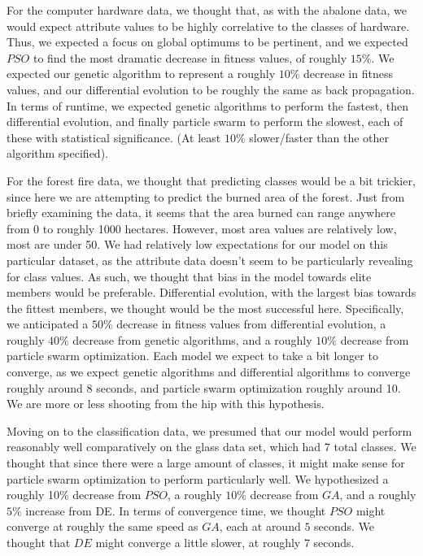 \documentclass[twoside,11pt]{article}
\begin{document}
  For the computer hardware data, we thought that, as with the abalone data, we would expect attribute values to be highly correlative to the classes of hardware.
  Thus, we expected a focus on global optimums to be pertinent, and we expected $PSO$ to find the most dramatic decrease in fitness values, of roughly $15\%$.
  We expected our genetic algorithm to represent a roughly $10\%$ decrease in fitness values, and our differential evolution to be roughly the same as back propagation.
  In terms of runtime, we expected genetic algorithms to perform the fastest, then differential evolution, and finally particle swarm to perform the slowest, each of these
  with statistical significance. (At least $10\%$ slower/faster than the other algorithm specified).

  For the forest fire data, we thought that predicting classes would be a bit trickier, since here we are attempting to predict the burned area of the forest.
  Just from briefly examining the data, it seems that the area burned can range anywhere from 0 to roughly 1000 hectares. However, most area values are relatively low,
  most are under 50. We had relatively low expectations for our model on
  this particular dataset, as the attribute data doesn't seem to be particularly revealing for class values. As such, we thought that bias in the model towards elite members would
  be preferable. Differential evolution, with the largest bias towards the fittest members, we thought would be the most successful here. 
  Specifically, we anticipated a $50\%$ decrease in fitness values from differential evolution, a roughly $40\%$ decrease from genetic algorithms, and 
  a roughly $10\%$ decrease from particle swarm optimization. Each model we expect to take a bit longer to converge, as we expect genetic algorithms and differential algorithms
  to converge roughly around 8 seconds, and particle swarm optimization roughly around 10. We are more or less shooting from the hip with this hypothesis. 

  Moving on to the classification data, we presumed that our model would perform reasonably well comparatively on the glass data set, which had 7 total classes. We thought that 
  since there were a large amount of classes, it might make sense for particle swarm optimization to perform particularly well. We hypothesized a roughly 10\% decrease from $PSO$,
  a roughly $10\%$ decrease from $GA$, and a roughly $5\%$ increase from DE. In terms of convergence time, we thought $PSO$ might converge at roughly the same speed as $GA$, each at 
  around $5$ seconds. We thought that $DE$ might converge a little slower, at roughly 7 seconds.
\end{document}
